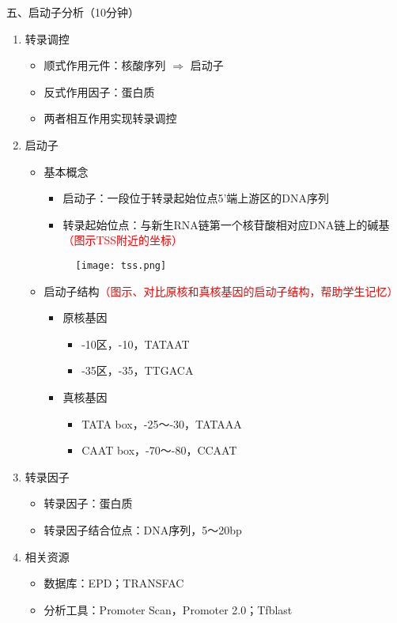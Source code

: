 \documentclass{TIJMUjiaoanLL}
\begin{document}
\vspace*{0.2cm}
\noindent
五、启动子分析（10分钟）
\begin{enumerate}
  \item 转录调控
    \begin{itemize}
      \item 顺式作用元件：核酸序列 $\Rightarrow$ 启动子
      \item 反式作用因子：蛋白质
      \item 两者相互作用实现转录调控
    \end{itemize}
  \item 启动子
    \begin{itemize}
      \item 基本概念
        \begin{itemize}
          \item 启动子：一段位于转录起始位点5'端上游区的DNA序列
          \item 转录起始位点：与新生RNA链第一个核苷酸相对应DNA链上的碱基\textcolor{red}{（图示TSS附近的坐标）}
        \end{itemize}
      \begin{figure}[h]
        \centering
        \texttt{[image: tss.png]}
      \end{figure}
      \item 启动子结构\textcolor{red}{（图示、对比原核和真核基因的启动子结构，帮助学生记忆）}
        \begin{itemize}
          \item 原核基因
            \begin{itemize}
	      \item -10区，-10，TATAAT
	      \item -35区，-35，TTGACA
	    \end{itemize}
          \item 真核基因
            \begin{itemize}
	      \item TATA box，-25～-30，TATAAA
	      \item CAAT box，-70～-80，CCAAT
	    \end{itemize}
        \end{itemize}
    \end{itemize}
  \item 转录因子
    \begin{itemize}
      \item 转录因子：蛋白质
      \item 转录因子结合位点：DNA序列，5～20bp
    \end{itemize}
  \item 相关资源
    \begin{itemize}
      \item 数据库：EPD；TRANSFAC
      \item 分析工具：Promoter Scan，Promoter 2.0；Tfblast
    \end{itemize}
\end{enumerate}
\end{document}
